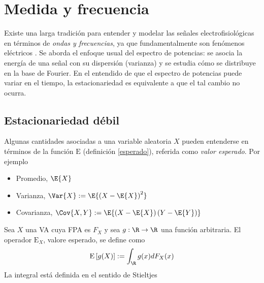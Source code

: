 
\chapter{Medida y frecuencia}

Existe una larga tradición para entender y modelar las señales electrofisiológicas en términos de 
\textit{ondas y frecuencias}, ya que fundamentalmente son fenómenos eléctricos \cite{Kaiser00}.
%
Se aborda el enfoque usual del espectro de potencias: se asocia la energía de una señal con su 
dispersión (varianza) y se estudia cómo se distribuye en la base de Fourier.
%
En el entendido de que el espectro de potencias puede variar en el tiempo, la estacionariedad
es equivalente a que el tal cambio no ocurra.



\section{Estacionariedad débil}

Algunas cantidades asociadas a una variable aleatoria $X$ pueden entenderse en términos de la 
función $\mathrm{E}$ (definición \ref{esperado}), referida como \textit{valor esperado}.
%
Por ejemplo
\begin{itemize}
\item Promedio, $\E{X}$
\item Varianza, $\Var{X} := \E{\left( X - \E{X} \right)^{2}}$
\item Covarianza, $\Cov{X,Y} := \E{\left( X - \E{X} \right)\left( Y - \E{Y} \right)}$
\end{itemize}

\begin{definicion}
Sea $X$ una VA cuya FPA es $F_X$ y sea $g: \R \rightarrow \R$ una función arbitraria. El operador
$\mathrm{E}_X$, valore esperado, se define como
\begin{equation}
\mathrm{E}\left[ g(X) \right] := \int_{\R} g(x) dF_X(x)
\end{equation}
La integral está definida en el sentido de Stieltjes
\label{esperado}
\end{definicion}

